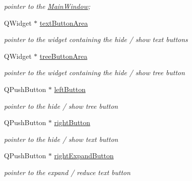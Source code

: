 \begin{DoxyCompactItemize}
\begin{DoxyCompactList}\small\item\em pointer to the \hyperlink{class_main_window}{\-Main\-Window}; \end{DoxyCompactList}\item 
\hypertarget{class_area_a6c88fecf579e816309421ebb2f4110e8}{\-Q\-Widget $\ast$ \hyperlink{class_area_a6c88fecf579e816309421ebb2f4110e8}{text\-Button\-Area}}\label{class_area_a6c88fecf579e816309421ebb2f4110e8}

\begin{DoxyCompactList}\small\item\em pointer to the widget containing the hide / show text buttons \end{DoxyCompactList}\item 
\hypertarget{class_area_a48df84597b567dfc8b54305ca9faf072}{\-Q\-Widget $\ast$ \hyperlink{class_area_a48df84597b567dfc8b54305ca9faf072}{tree\-Button\-Area}}\label{class_area_a48df84597b567dfc8b54305ca9faf072}

\begin{DoxyCompactList}\small\item\em pointer to the widget containing the hide / show tree button \end{DoxyCompactList}\item 
\hypertarget{class_area_ac3abf6be3202aedd2cc9ccf8da053989}{\-Q\-Push\-Button $\ast$ \hyperlink{class_area_ac3abf6be3202aedd2cc9ccf8da053989}{left\-Button}}\label{class_area_ac3abf6be3202aedd2cc9ccf8da053989}

\begin{DoxyCompactList}\small\item\em pointer to the hide / show tree button \end{DoxyCompactList}\item 
\hypertarget{class_area_a7dda00e73b5dda5bcf308bc9451d47aa}{\-Q\-Push\-Button $\ast$ \hyperlink{class_area_a7dda00e73b5dda5bcf308bc9451d47aa}{right\-Button}}\label{class_area_a7dda00e73b5dda5bcf308bc9451d47aa}

\begin{DoxyCompactList}\small\item\em pointer to the hide / show text button \end{DoxyCompactList}\item 
\hypertarget{class_area_abe2c125e65ad35f1a154ec4b044a7cf1}{\-Q\-Push\-Button $\ast$ \hyperlink{class_area_abe2c125e65ad35f1a154ec4b044a7cf1}{right\-Expand\-Button}}\label{class_area_abe2c125e65ad35f1a154ec4b044a7cf1}

\begin{DoxyCompactList}\small\item\em pointer to the expand / reduce text button \end{DoxyCompactList}\end{DoxyCompactItemize}


